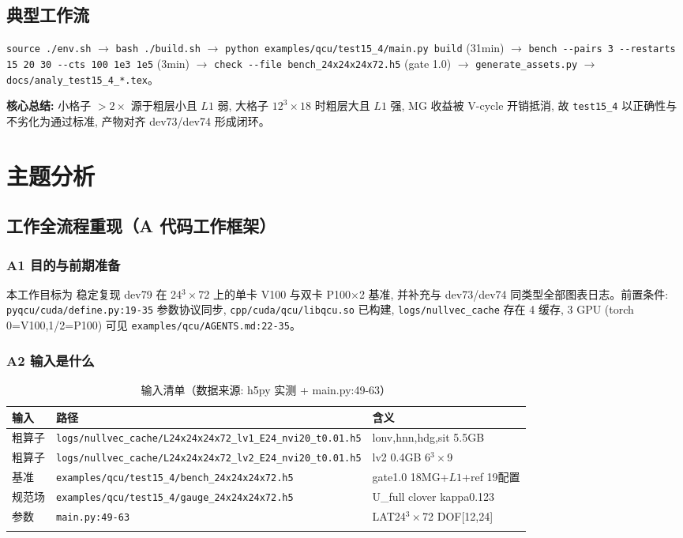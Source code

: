 \documentclass[UTF8]{ctexart}
\begin{document}
\subsection{典型工作流}
\texttt{\nolinkurl{source ./env.sh}} $\to$ \texttt{\nolinkurl{bash ./build.sh}} $\to$ \texttt{\nolinkurl{python examples/qcu/test15_4/main.py build}} (31min) $\to$ \texttt{\nolinkurl{bench --pairs 3 --restarts 15 20 30 --cts 100 1e3 1e5}} (3min) $\to$ \texttt{\nolinkurl{check --file bench_24x24x24x72.h5}} (gate 1.0) $\to$ \texttt{\nolinkurl{generate_assets.py}} $\to$ \texttt{\nolinkurl{docs/analy_test15_4_*.tex}}。

\begin{ideabox}
\textbf{核心总结:} 小格子 $>2\times$ 源于粗层小且 $L1$ 弱, 大格子 $12^3\times18$ 时粗层大且 $L1$ 强, MG 收益被 V-cycle 开销抵消, 故 \texttt{\nolinkurl{test15_4}} 以正确性与不劣化为通过标准, 产物对齐 dev73/dev74 形成闭环。
\end{ideabox}

\section{主题分析}
\subsection{工作全流程重现（A 代码工作框架）}

\subsubsection{A1 目的与前期准备}
本工作目标为 \textcolor{struct}{稳定复现 dev79 在 24$^3\times$72 上的单卡 V100 与双卡 P100$\times$2 基准, 并补充与 dev73/dev74 同类型全部图表日志}。前置条件: \texttt{\nolinkurl{pyqcu/cuda/define.py:19-35}} 参数协议同步, \texttt{\nolinkurl{cpp/cuda/qcu/libqcu.so}} 已构建, \texttt{\nolinkurl{logs/nullvec_cache}} 存在 4 缓存, 3 GPU (torch 0=V100,1/2=P100) 可见 \textcolor{evidence}{\texttt{\nolinkurl{examples/qcu/AGENTS.md:22-35}}}。

\subsubsection{A2 输入是什么}
\begin{xltabular}{\textwidth}{lXl}
\toprule
输入 & 路径 & 含义 \\
\midrule
\endhead
粗算子 & \texttt{\nolinkurl{logs/nullvec_cache/L24x24x24x72_lv1_E24_nvi20_t0.01.h5}} & lonv,hnn,hdg,sit 5.5GB \\
粗算子 & \texttt{\nolinkurl{logs/nullvec_cache/L24x24x24x72_lv2_E24_nvi20_t0.01.h5}} & lv2 0.4GB 6$^3\times$9 \\
基准 & \texttt{\nolinkurl{examples/qcu/test15_4/bench_24x24x24x72.h5}} & gate1.0 18MG+$L1$+ref 19配置 \\
规范场 & \texttt{\nolinkurl{examples/qcu/test15_4/gauge_24x24x24x72.h5}} & U\_full clover kappa0.123 \\
参数 & \texttt{\nolinkurl{main.py:49-63}} & LAT24$^3\times$72 DOF[12,24] \\
\bottomrule
\caption{输入清单（数据来源: h5py 实测 + main.py:49-63）}
\end{xltabular}
\end{document}
